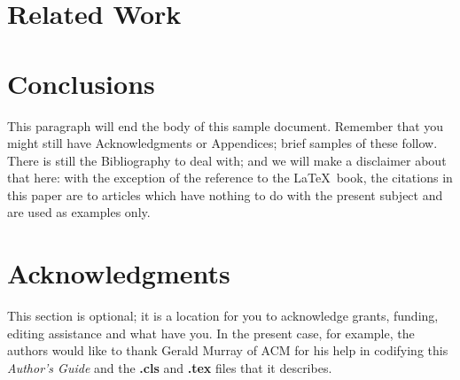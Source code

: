 \documentclass{sig-alternate}
\begin{document}
%

\section{Related Work}\label{related}
\section{Conclusions}
This paragraph will end the body of this sample document.
Remember that you might still have Acknowledgments or
Appendices; brief samples of these
follow.  There is still the Bibliography to deal with; and
we will make a disclaimer about that here: with the exception
of the reference to the \LaTeX\ book, the citations in
this paper are to articles which have nothing to
do with the present subject and are used as
examples only.

\section{Acknowledgments}
This section is optional; it is a location for you
to acknowledge grants, funding, editing assistance and
what have you.  In the present case, for example, the
authors would like to thank Gerald Murray of ACM for
his help in codifying this \textit{Author's Guide}
and the \textbf{.cls} and \textbf{.tex} files that it describes.

%

%
%
\end{document}
